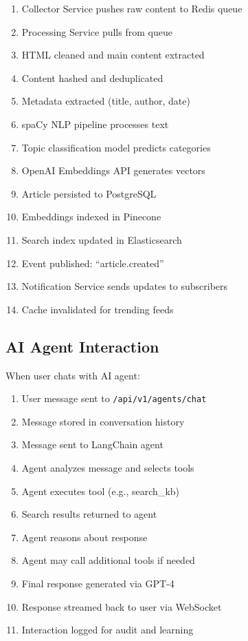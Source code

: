 \documentclass[12pt,a4paper]{report}
\begin{document}
\begin{enumerate}
    \item Collector Service pushes raw content to Redis queue
    \item Processing Service pulls from queue
    \item HTML cleaned and main content extracted
    \item Content hashed and deduplicated
    \item Metadata extracted (title, author, date)
    \item spaCy NLP pipeline processes text
    \item Topic classification model predicts categories
    \item OpenAI Embeddings API generates vectors
    \item Article persisted to PostgreSQL
    \item Embeddings indexed in Pinecone
    \item Search index updated in Elasticsearch
    \item Event published: ``article.created''
    \item Notification Service sends updates to subscribers
    \item Cache invalidated for trending feeds
\end{enumerate}

\subsection{AI Agent Interaction}

When user chats with AI agent:

\begin{enumerate}
    \item User message sent to \texttt{/api/v1/agents/chat}
    \item Message stored in conversation history
    \item Message sent to LangChain agent
    \item Agent analyzes message and selects tools
    \item Agent executes tool (e.g., search\_kb)
    \item Search results returned to agent
    \item Agent reasons about response
    \item Agent may call additional tools if needed
    \item Final response generated via GPT-4
    \item Response streamed back to user via WebSocket
    \item Interaction logged for audit and learning
\end{enumerate}
\end{document}
